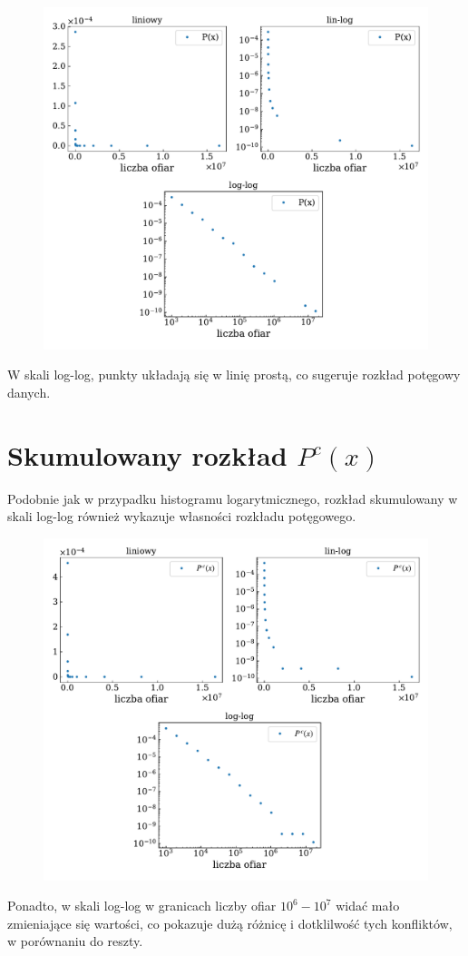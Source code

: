 \documentclass[13pt,a4paper]{article}
\begin{document}
\begin{figure}[ht!]
    \centering
    \includegraphics{./hist_log.pdf}
\end{figure}

W skali log-log, punkty układają się w linię prostą, co sugeruje rozkład potęgowy danych.


\pagebreak
\section{Skumulowany rozkład $P^c(x)$}

Podobnie jak w przypadku histogramu logarytmicznego, rozkład skumulowany w skali log-log również wykazuje własności rozkładu potęgowego.

\begin{figure}[ht!]
    \centering
    \includegraphics{./hist_cum.pdf}
\end{figure}

Ponadto, w skali log-log w granicach liczby ofiar $10^6-10^7$ widać mało zmieniające się wartości, co pokazuje dużą różnicę i dotklilwość tych konfliktów, w porównaniu do reszty.
\end{document}
